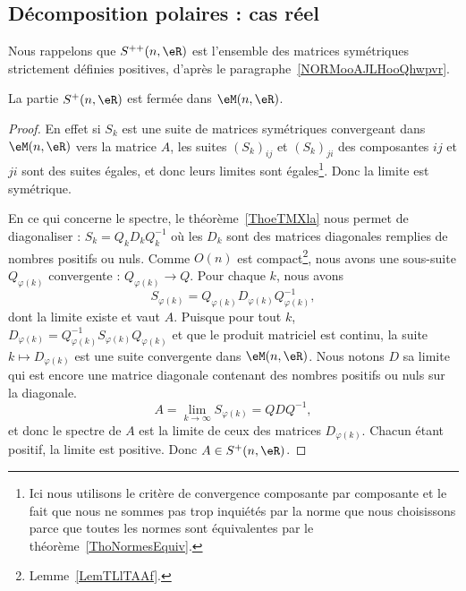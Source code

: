 \subsection{Décomposition polaires : cas réel}

Nous rappelons que \( S^{++}(n,\eR)\) est l'ensemble des matrices symétriques strictement définies positives, d'après le paragraphe~\ref{NORMooAJLHooQhwpvr}.

\begin{lemma}   \label{LemMGUSooPqjguE}
	La partie \( S^+(n,\eR)\) est fermée dans \( \eM(n,\eR)\).
\end{lemma}

\begin{proof}
	En effet si \( S_k\) est une suite de matrices symétriques convergeant dans \( \eM(n,\eR)\) vers la matrice \( A\), les suites \( (S_k)_{ij}\) et \( (S_k)_{ji}\) des composantes \( ij\) et \( ji\) sont des suites égales, et donc leurs limites sont égales\footnote{Ici nous utilisons le critère de convergence composante par composante et le fait que nous ne sommes pas trop inquiétés par la norme que nous choisissons parce que toutes les normes sont équivalentes par le théorème~\ref{ThoNormesEquiv}.}. Donc la limite est symétrique.

	En ce qui concerne le spectre, le théorème~\ref{ThoeTMXla} nous permet de diagonaliser : \( S_k=Q_kD_kQ_k^{-1}\) où les \( D_k\) sont des matrices diagonales remplies de nombres positifs ou nuls. Comme \( O(n)\) est compact\footnote{Lemme~\ref{LemTLlTAAf}.}, nous avons une sous-suite \( Q_{\varphi(k)}\) convergente : \( Q_{\varphi(k)}\to Q\). Pour chaque \( k\), nous avons
	\begin{equation}
		S_{\varphi(k)}=Q_{\varphi(k)}D_{\varphi(k)}Q^{-1}_{\varphi(k)},
	\end{equation}
	dont la limite existe et vaut \( A\). Puisque pour tout \( k\), \( D_{\varphi(k)}=Q^{-1}_{\varphi(k)}S_{\varphi(k)}Q_{\varphi(k)}\) et que le produit matriciel est continu, la suite \( k\mapsto D_{\varphi(k)}\) est une suite convergente dans \( \eM(n,\eR)\). Nous notons \( D\) sa limite qui est encore une matrice diagonale contenant des nombres positifs ou nuls sur la diagonale.
	\begin{equation}
		A=\lim_{k\to \infty } S_{\varphi(k)}=QDQ^{-1},
	\end{equation}
	et donc le spectre de \( A\) est la limite de ceux des matrices \( D_{\varphi(k)}\). Chacun étant positif, la limite est positive. Donc \( A\in S^+(n,\eR)\).
\end{proof}

